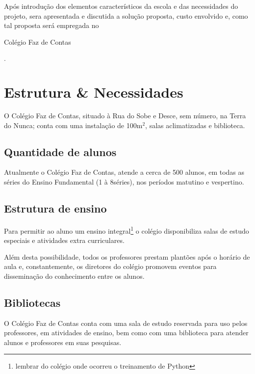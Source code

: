 \documentclass[a4paper,12pt]{report}
\begin{document}
        Após introdução dos elementos característicos da escola e das
        necessidades do projeto, sera apresentada e discutida a solução
        proposta, custo envolvido e, como tal proposta será empregada no
        \begin{bfseries}Colégio Faz de Contas\end{bfseries}.

        \section{Estrutura \& Necessidades}
        \label{sc:laboratorio_estrutura}
        O Colégio Faz de Contas, situado à Rua do Sobe e Desce, sem
        número, na Terra do Nunca; conta com uma instalação de
        100m\begin{math}^{2}\end{math}, salas aclimatizadas e biblioteca.

            \subsection{Quantidade de alunos}
            Atualmente o Colégio Faz de Contas, atende a cerca de 500
            alunos, em todas as séries do Ensino Fundamental (1\textordfeminine
            à 8\textordfeminine séries), nos períodos matutino e vespertino.

            \subsection{Estrutura de ensino}
            Para permitir ao aluno um ensino integral\footnote{lembrar do
            colégio onde ocorreu o treinamento de Python} o colégio
            disponibiliza salas de estudo especiais e atividades extra
            curriculares.

            Além desta possibilidade, todos os professores prestam plantões
            após o horário de aula e, constantemente, os diretores do colégio
            promovem eventos para disseminação do conhecimento entre os
            alunos.

            \subsection{Bibliotecas}
            O Colégio Faz de Contas conta com uma sala de estudo reservada
            para uso pelos professores, em atividades de ensino, bem como com
            uma biblioteca para atender alunos e professores em suas pesquisas.
\end{document}
